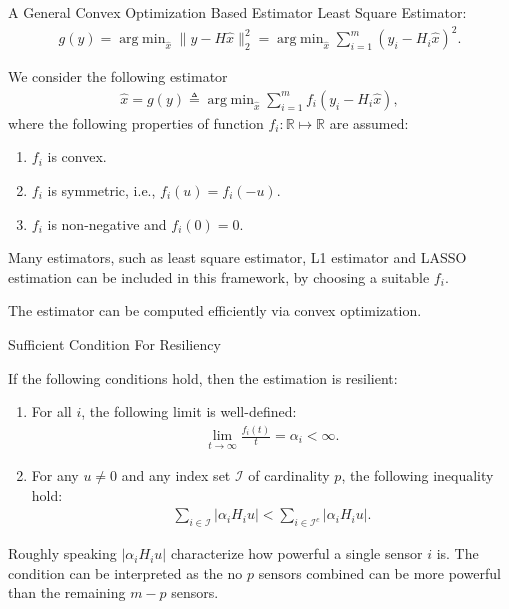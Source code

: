 \documentclass[10pt]{beamer}
\DeclareMathOperator{\argmin}{arg\;min}
\begin{document}
\begin{frame}{A General Convex Optimization Based Estimator}
  Least Square Estimator:
 \begin{align*}
      g(y) = \argmin_{\hat x} \|y-H\hat x\|_2^2= \argmin_{\hat x}  \sum_{i=1}^m (y_i-H_i\hat x)^2.
 \end{align*}
 
  We consider the following estimator
  \begin{align*}
    \hat x = g(y) \triangleq \argmin_{\hat x} \sum_{i=1}^m f_i(y_i-H_i \hat x),
  \end{align*}
  where the following properties of function $f_i:\mathbb R\mapsto \mathbb R$ are assumed:
  \begin{enumerate}
  \item $f_i$ is convex.
  \item $f_i$ is symmetric, i.e., $f_i(u) = f_i(-u)$.
  \item $f_i$ is non-negative and $f_i(0) = 0$.
  \end{enumerate} 

  Many estimators, such as least square estimator, L1 estimator and LASSO estimation can be included in this framework, by choosing a suitable $f_i$.

  The estimator can be computed efficiently via convex optimization. 
\end{frame}

\begin{frame}{Sufficient Condition For Resiliency}
  \begin{theorem}
    If the following conditions hold, then the estimation is resilient:
    \begin{enumerate}
    \item For all $i$, the following limit is well-defined:
      \begin{align*}
        \lim_{t\rightarrow\infty}\frac{f_i(t)}{t} = \alpha_i < \infty.
      \end{align*}
    \item For any $u\neq 0$ and any index set $\mathcal I$ of cardinality $p$, the following inequality hold:
      \begin{align*}
        \sum_{i\in \mathcal I} |\alpha_i H_i u| < \sum_{i\in \mathcal I^c} |\alpha_i H_i u|.
      \end{align*}
    \end{enumerate}
  \end{theorem}
  Roughly speaking $|\alpha_i H_i u|$ characterize how powerful a single sensor $i$ is. The condition can be interpreted as the no $p$ sensors combined can be more powerful than the remaining $m-p$ sensors.
\end{frame}
\end{document}
